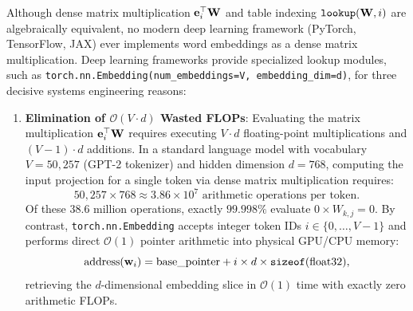 \documentclass[../../main.tex]{subfiles}
\begin{document}
Although dense matrix multiplication $\mathbf{e}_i^\top \mathbf{W}$ and table indexing $\text{\texttt{lookup}}(\mathbf{W}, i)$ are algebraically equivalent, no modern deep learning framework (PyTorch, TensorFlow, JAX) ever implements word embeddings as a dense matrix multiplication. Deep learning frameworks provide specialized lookup modules, such as \texttt{torch.nn.Embedding(num\_embeddings=V, embedding\_dim=d)}, for three decisive systems engineering reasons:

\begin{enumerate}
    \item \textbf{Elimination of $\mathcal{O}(V \cdot d)$ Wasted FLOPs}:
    Evaluating the matrix multiplication $\mathbf{e}_i^\top \mathbf{W}$ requires executing $V \cdot d$ floating-point multiplications and $(V-1) \cdot d$ additions. In a standard language model with vocabulary $V = 50{,}257$ (GPT-2 tokenizer) and hidden dimension $d = 768$, computing the input projection for a single token via dense matrix multiplication requires:
    \begin{equation}
    \label{eq:flops_wasted}
    50{,}257 \times 768 \approx 3.86 \times 10^7 \text{ arithmetic operations per token}.
    \end{equation}
    Of these $38.6$ million operations, exactly $99.998\%$ evaluate $0 \times W_{k, j} = 0$. By contrast, \texttt{torch.nn.Embedding} accepts integer token IDs $i \in \{0, \dots, V-1\}$ and performs direct $\mathcal{O}(1)$ pointer arithmetic into physical GPU/CPU memory:
    \begin{equation}
    \label{eq:pointer_arithmetic}
    \text{address}(\mathbf{w}_i) = \text{base\_pointer} + i \times d \times \text{\texttt{sizeof}}(\text{float32}),
    \end{equation}
    retrieving the $d$-dimensional embedding slice in $\mathcal{O}(1)$ time with exactly zero arithmetic FLOPs.


\end{enumerate}
\end{document}
